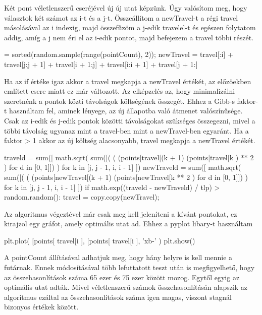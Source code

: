 Két pont véletlenszerű cseréjével új új utat képzünk. Úgy valósítom meg, hogy választok két számot az i-t és a j-t. Összeállítom a newTravel-t a régi travel másolásával az i indexig, majd összefűzöm a j-edik travelel-t és egészen folytatom addig, amíg a j nem éri el az i-edik pontot, majd befejezem a travel többi részét.


\begin{python}
[i, j] = sorted(random.sample(range(pointCount), 2));
newTravel = travel[:i] + 
			travel[j:j + 1] + 
			travel[i + 1:j] + 
			travel[i:i + 1] + 
			travel[j + 1:]
\end{python}


Ha az if értéke igaz akkor a travel megkapja a newTravel értékét, az előzöekben említett csere miatt ez már változott. Az elképzelés az, hogy minimalizálni szeretnénk a pontok közti távolságok költségének összegét. Ehhez a Gibb-s faktor-t használtam fel, aminek lényege, az új állapotba való átmenet valószínűsége. Csak az i-edik és j-edik pontok közötti távolságokat szükséges összegezni, mivel a többi távolság ugyanaz mint a travel-ben mint a newTravel-ben egyaránt. Ha a faktor > 1 akkor az új költség alacsonyabb, travel megkapja a newTravel értékét.


\begin{python}
traveld = sum([
	math.sqrt(
		sum([(
			(
			  (points[travel[(k + 1) %
			  (points[travel[k %
			) **  2
		) for d in [0, 1]])
	) for k in [j, j - 1, i, i - 1]
])
newTraveld = sum([
	math.sqrt(
		sum([(
			(
			  (points[newTravel[(k + 1) %
			  (points[newTravel[k %
			** 2
		) for d in [0, 1]])
	) for k in [j, j - 1, i, i - 1]
])
    if math.exp((traveld - newTraveld) / tlp) > random.random():
        travel = copy.copy(newTravel);
\end{python}        


Az algoritmus végeztével már csak meg kell jeleníteni a kívánt pontokat, ez kirajzol egy gráfot, amely optimális utat ad. Ehhez a pyplot libary-t használtam


\begin{python}
plt.plot(
	[points[
		travel[i %
	], 
	[points[
		travel[i %
	], 
	'xb-'
)
plt.show()
\end{python}


A pointCount állításával adhatjuk meg, hogy hány helyre is kell mennie a futárnak. Ennek módosításával több lefuttatott teszt után is megfigyelhető, hogy az összehasonlítások száma 65 ezer és 75 ezer között mozog. Egytől egyig az optimális utat adták. Mivel véletlenszerű számok összehasonlításán alapszik az algoritmus ezáltal az összehasonlítások száma igen magas, viszont stagnál bizonyos értékek között.

